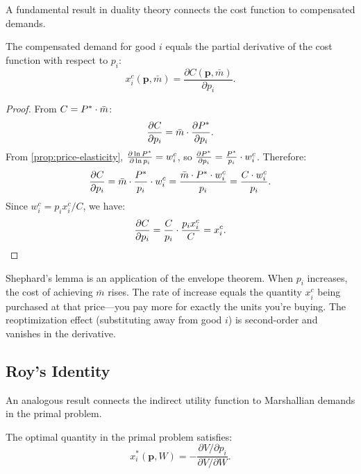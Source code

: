 A fundamental result in duality theory connects the cost function to compensated demands.

\begin{proposition}
\label{prop:shephard}
The compensated demand for good $i$ equals the partial derivative of the cost function with respect to $p_i$:
\begin{equation}
\label{eq:shephard}
\boxed{x_i^c(\mathbf{p}, \bar{m}) = \frac{\partial C(\mathbf{p}, \bar{m})}{\partial p_i}.}
\end{equation}
\end{proposition}

\begin{proof}
From $C = P^{*} \cdot \bar{m}$:
\[
\frac{\partial C}{\partial p_i} = \bar{m} \cdot \frac{\partial P^{*}}{\partial p_i}.
\]
From \cref{prop:price-elasticity}, $\frac{\partial \ln P^{*}}{\partial \ln p_i} = w_i^c$, so $\frac{\partial P^{*}}{\partial p_i} = \frac{P^{*}}{p_i} \cdot w_i^c$. Therefore:
\[
\frac{\partial C}{\partial p_i} = \bar{m} \cdot \frac{P^{*}}{p_i} \cdot w_i^c = \frac{\bar{m} \cdot P^{*} \cdot w_i^c}{p_i} = \frac{C \cdot w_i^c}{p_i}.
\]
Since $w_i^c = p_i x_i^c / C$, we have:
\[
\frac{\partial C}{\partial p_i} = \frac{C}{p_i} \cdot \frac{p_i x_i^c}{C} = x_i^c. \qedhere
\]
\end{proof}

\begin{calloutnote}
Shephard's lemma is an application of the envelope theorem. When $p_i$ increases, the cost of achieving $\bar{m}$ rises. The rate of increase equals the quantity $x_i^c$ being purchased at that price---you pay more for exactly the units you're buying. The reoptimization effect (substituting away from good $i$) is second-order and vanishes in the derivative.
\end{calloutnote}

\subsection{Roy's Identity}
\label{subsec:roy}

An analogous result connects the indirect utility function to Marshallian demands in the primal problem.

\begin{proposition}
\label{prop:roy}
The optimal quantity in the primal problem satisfies:
\begin{equation}
\label{eq:roy}
\boxed{x_i^*(\mathbf{p}, W) = -\frac{\partial V / \partial p_i}{\partial V / \partial W}.}
\end{equation}
\end{proposition}

